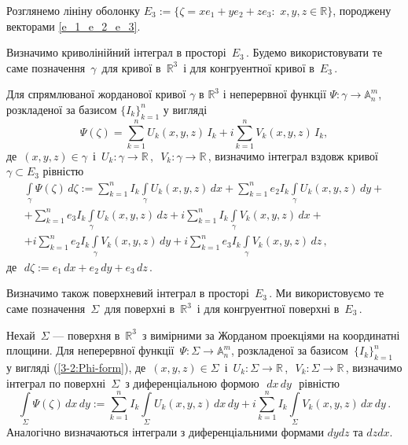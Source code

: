 \documentclass[11pt, reqno]{amsart}
\begin{document}
Розглянемо лініну оболонку $E_3:=\{\zeta=xe_1+ye_2+ze_3:\,\, x,y,z\in\mathbb{R}\}$,
породжену векторами \eqref{e_1_e_2_e_3}.


Визначимо криволінійний інтеграл в просторі\, $E_3$\,.
Будемо використовувати те саме позначення\, $\gamma$\, для кривої в\, ${\mathbb R}^3$\,
і для конгруентної кривої в\, $E_3$\,.


Для спрямлюваної жорданової кривої $\gamma$ в $\mathbb{R}^{3}$ і
неперервної функції $\Psi:\gamma\rightarrow\mathbb{A}_n^m$, розкладеної за базисом
$\{I_k\}_{k=1}^n$ у вигляді
\begin{equation}\label{3-2:Phi-form}
\Psi(\zeta)=\sum\limits_{k=1}^{n}{U_k(x,y,z)\,I_k}+i\sum
\limits_{k=1}^{n}{V_k(x,y,z)\,I_k},
\end{equation}
 де\, $(x,y,z)\in\gamma$\, і\, $U_k : \gamma\rightarrow\mathbb{R}$\,,\,\, $V_k :
\gamma\rightarrow\mathbb{R}$\,, визначимо інтеграл  вздовж
кривої $\gamma\subset E_3$ рівністю
\begin{multline*}
\int\limits_{\gamma}\Psi(\zeta)\,d\zeta:=\sum\limits_{k=1}^{n}
I_{k}\int\limits_{\gamma}U_{k}(x,y,z)\,dx+
\sum\limits_{k=1}^ne_{2}I_{k}\int\limits_{\gamma}U_{k}(x,y,z)\,dy+\\
+\sum\limits_{k=1}^ne_{3}I_{k}\int\limits_{\gamma}U_{k}(x,y,z)\,dz
+i\sum\limits_{k=1}^nI_{k}\int\limits_{\gamma}V_{k}(x,y,z)\,dx+\\
+i\sum\limits_{k=1}^ne_{2}I_{k}\int\limits_{\gamma}V_{k}(x,y,z)\,dy+
i\sum\limits_{k=1}^ne_{3}I_{k}\int\limits_{\gamma}V_{k}(x,y,z)\,dz\,,
\end{multline*}
де\,\, $d\zeta:=e_1\,dx+e_{2}\,dy+e_{3}\,dz$\,.

Визначимо також поверхневий інтеграл в просторі\, $E_3$\,.
Ми використовуємо те саме позначення\, $\Sigma$\, для поверхні в\, ${\mathbb R}^3$\,
і для конгруентної поверхні в\, $E_3$\,.

Нехай\, $\Sigma$ --- поверхня в\, $\mathbb{R}^{3}$\, з вимірними за Жорданом
проекціями на координатні площини. Для неперервної функції\, $\Psi : \Sigma\rightarrow \mathbb{A}_n^m$,
розкладеної за базисом\, $\{I_k\}_{k=1}^n$\, у вигляді
(\ref{3-2:Phi-form}), де\, $(x,y,z)\in\Sigma$\, і\, $U_k :
\Sigma\rightarrow\mathbb{R}$\,,\,\, $V_k : \Sigma\rightarrow\mathbb{R}$\,,
визначимо інтеграл по поверхні\, $\Sigma$\, з диференціальною формою\,\, $dx\,dy$\,\, рівністю
\[\int\limits_{\Sigma}\Psi(\zeta)\,dx\,dy:=
\sum\limits_{k=1}^nI_{k}\int\limits_{\Sigma}U_{k}(x,y,z)\,dx\,dy+
i\sum\limits_{k=1}^nI_{k}\int\limits_{\Sigma}V_{k}(x,y,z)\,dx\,dy\,.\]
Аналогічно визначаються інтеграли з диференціальними формами
$dydz$ та $dzdx$.
\end{document}
